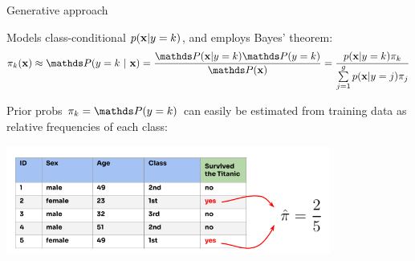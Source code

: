 \documentclass[11pt,compress,t,notes=noshow, xcolor=table]{beamer}
\begin{document}




\begin{vbframe}{Generative approach}

Models class-conditional $p(\mathbf{x} | y= k)$, and employs Bayes' theorem:
$$\pikx \approx \postk = \frac{\P(\xv | y = k) \P(y = k)}{\P(\xv)} = \frac{\pdfxyk \pik}{\sumjg \pdfxyk[j] \pi_j}$$

Prior probs $\pi_k = \P(y = k)$ can easily be estimated from training data as relative frequencies of each class:


\begin{center}
\includegraphics[width=0.8\textwidth]{figure_man/prior_probabilities.png} 
\end{center}

\end{vbframe}
\end{document}
